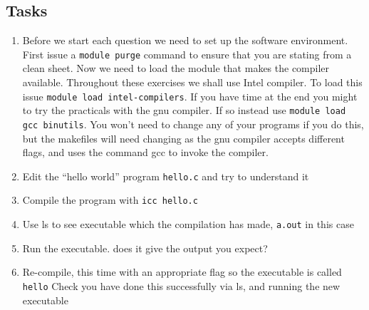 \documentclass[a4paper, 12pt]{article}
\def \cc   {\tt }               %
\begin{document}
\subsection*{Tasks}

\begin{enumerate}

  \item Before we start each question we need to set up the software 
    environment. First issue a {\cc module purge} command to ensure
    that you are stating from a clean sheet. Now we need to load
    the module that makes the compiler available.
    Throughout these exercises we shall use Intel compiler. To load this issue 
    {\cc module load intel-compilers}. If you have time at the end
    you might to try the practicals with the gnu
    compiler. If so instead use {\cc module load gcc binutils}.
    You won't need to change any of your programs if you do this, but the
    makefiles will need changing as the gnu compiler accepts different flags, and uses
    the command gcc to invoke the compiler.

  \item Edit the ``hello world'' program {\cc hello.c} and try to understand it

  \item Compile the program with {\cc icc hello.c}

  \item Use ls to see executable which the compilation has made, {\cc a.out} in this case

  \item Run the executable. does it give the output you expect?

  \item Re-compile, this time with an appropriate flag so the executable is called {\cc hello}
    Check you have done this successfully via ls, and running the new executable

\end{enumerate}


\end{document}

